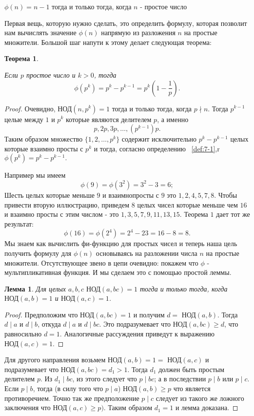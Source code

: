 \documentclass[11pt]{article}
\newtheorem{theorem}{Теорема}
\newtheorem{lemma}{Лемма}
\begin{document}
\begin{center}
	$\phi (n)=n-1$ тогда и только тогда, когда $n$ - простое число
\end{center}
Первая вещь, которую нужно сделать, это определить формулу, которая позволит нам вычислять значение $\phi (n)$ напрямую из разложения $n$ на простые множители. Большой шаг напути к этому делает следующая теорема: 
\begin{theorem}
\label{th:7-1}
	
	Если $ p $ простое число и $ k>0 $, тогда 
	\[\phi (p^{k})=	p^{k}-p^{k-1}=p^{k}(1-\dfrac{1}{p}).\]
\end{theorem} 
\begin{proof}
	Очевидно,  $\text{НОД}(n,p^k)=1$ тогда и только тогда, когда $p\nmid n$. Тогда $p^{k-1}$ целые между $1$ и $p^{k}$ которые являются делителем $p$, а именно  
	\[p,2p,3p, \ldots, (p^{k-1})p.\] Таким образом множество $\{1,2,\ldots,p^k\}$ содержит исключительно $p^{k}-p^{k-1}$ целых которые взаимно просты с $p^k$ и тогда, согласно определению ~\ref{def:7-1},r $\phi (p^k)=p^{k}-p^{k-1}.$	
	
	Например мы имеем 
	\[
	\phi (9)=\phi (3^2)=3^{2}-3=6;
	\]
	Шесть целых которые меньше $9$ и взаимнопросты с $9$ это $1, 2, 4, 5, 7, 8$.
	Чтобы привести вторую иллюстрацию, приведем $8$ целых чисел которые меньше чем $16$ и взаимно просты с этим числом - это $1,3,5,7,9,11,13,15$. Теорема $1$ дает тот же результат:
	\[
	\phi (16)= \phi (2^4)=2^{4}-2{3}=16-8=8.
	\]
	Мы знаем как вычислить фи-функцию для простых чисел и теперь наша цель получить формулу для $\phi (n)$ основываясь на разложении числа $n$ на простые множители. Отсутствующее звено в цепи очевидно: покажем что $\phi $ - мультипликативная функция. И мы сделаем это с помощью простой леммы.
	
\begin{lemma}
Для целых $a, b, c$  $\text{НОД}(a,bc) = 1$ тогда и только тогда, когда  $\text{НОД}(a,b)=1$ и  $\text{НОД}(a,c)=1$.
\end{lemma}
\begin{proof}
	Предположим что  $\text{НОД}(a,bc)=1$ и получим $d=$ $\text{НОД}(a,b)$. Тогда $d\mid a$ и $d\mid b$, откуда $d \mid a$ и $d\mid bc$. Это подразумевает что НОД$(a,bc) \geq d$, что равносильно $d=1$. Аналогичные рассуждения приведут к выражению  $\text{НОД}(a,c)=1$. 
\end{proof}
	Для другого направления возьмем  $\text{НОД}(a,b)=1=$ $\text{НОД}(a,c)$ и подразумевает что  $\text{НОД}(a,bc)=d_{1}>1.$ Тогда $d_1$ должен быть простым делителем $p$. Из $d_{1} \mid bc$, из этого следует что $p \mid bc$; а в последствии $p \mid b$ или $p \mid c$. Если $p \mid b$, тогда (в силу того что $p \mid a$)  $\text{НОД}(a,b) \geq p $ что является противоречием. Точно так же предположение $p \mid c$ следует из такого же ложного заключения что  $\text{НОД}(a,c) \geq p)$. Таким образом $d_1 = 1$ и лемма доказана.
\end{proof}
\end{document}
